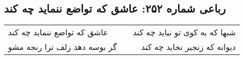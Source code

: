 \begin{center}
\section*{رباعی شماره ۲۵۲: عاشق که تواضع ننماید چه کند}
\label{sec:sh252}
\begin{longtable}{l p{0.5cm} r}
عاشق که تواضع ننماید چه کند
&&
شبها که به کوی تو نیاید چه کند
\\
گر بوسه دهد زلف ترا رنجه مشو
&&
دیوانه که زنجیر نخاید چه کند
\\
\end{longtable}
\end{center}
